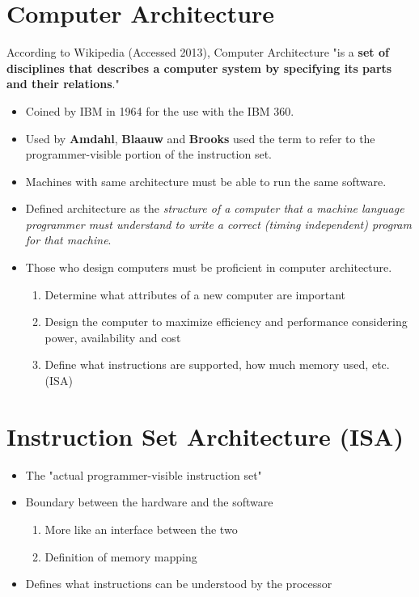 \documentclass[9pt,twocolumn]{article}
\begin{document}
\section*{Computer Architecture}
  According to Wikipedia (Accessed 2013), Computer Architecture "is a \textbf{set of disciplines that describes a computer system by specifying its parts and their relations}."
  \begin{itemize}
    \item Coined by IBM in 1964 for the use with the IBM 360.
    \item Used by \textbf{Amdahl}, \textbf{Blaauw} and \textbf{Brooks} used the term to refer to the programmer-visible portion of the instruction set.
    \item Machines with same architecture must be able to run the same software.
    \item Defined architecture as the \emph{structure of a computer that a machine language programmer must understand to write a correct (timing independent) program for that machine}.
    \item Those who design computers must be proficient in computer architecture.
      \begin{enumerate}
        \item Determine what attributes of a new computer are important
        \item Design the computer to maximize efficiency and performance considering power, availability and cost
        \item Define what instructions are supported, how much memory used, etc. (ISA)
      \end{enumerate}
  \end{itemize}

\section*{Instruction Set Architecture (ISA)}
  \begin{itemize}
    \item The "actual programmer-visible instruction set"
    \item Boundary between the hardware and the software
      \begin{enumerate}
        \item More like an interface between the two
        \item Definition of memory mapping
      \end{enumerate}
    \item Defines what instructions can be understood by the processor
  \end{itemize}
\end{document}
